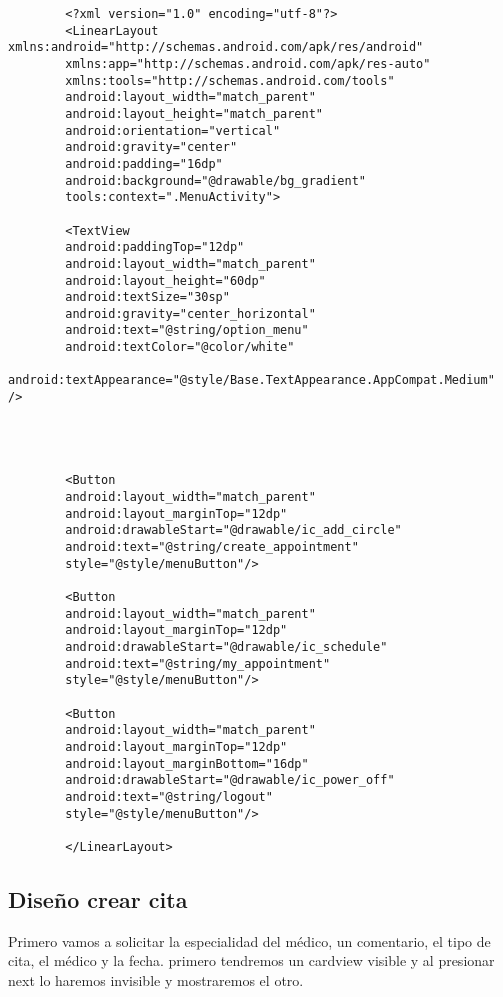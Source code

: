 \documentclass[a4paper]{article}
\begin{document}
	\begin{lstlisting}
		<?xml version="1.0" encoding="utf-8"?>
		<LinearLayout xmlns:android="http://schemas.android.com/apk/res/android"
		xmlns:app="http://schemas.android.com/apk/res-auto"
		xmlns:tools="http://schemas.android.com/tools"
		android:layout_width="match_parent"
		android:layout_height="match_parent"
		android:orientation="vertical"
		android:gravity="center"
		android:padding="16dp"
		android:background="@drawable/bg_gradient"
		tools:context=".MenuActivity">
		
		<TextView
		android:paddingTop="12dp"
		android:layout_width="match_parent"
		android:layout_height="60dp"
		android:textSize="30sp"
		android:gravity="center_horizontal"
		android:text="@string/option_menu"
		android:textColor="@color/white"
		android:textAppearance="@style/Base.TextAppearance.AppCompat.Medium" />
		
		
		
		
		<Button
		android:layout_width="match_parent"
		android:layout_marginTop="12dp"
		android:drawableStart="@drawable/ic_add_circle"
		android:text="@string/create_appointment"
		style="@style/menuButton"/>
		
		<Button
		android:layout_width="match_parent"
		android:layout_marginTop="12dp"
		android:drawableStart="@drawable/ic_schedule"
		android:text="@string/my_appointment"
		style="@style/menuButton"/>
		
		<Button
		android:layout_width="match_parent"
		android:layout_marginTop="12dp"
		android:layout_marginBottom="16dp"
		android:drawableStart="@drawable/ic_power_off"
		android:text="@string/logout"
		style="@style/menuButton"/>
		
		</LinearLayout>
	\end{lstlisting}
		
	
	
	
	\subsection{Diseño crear cita}
	
	Primero vamos a solicitar la especialidad del médico, un comentario, el tipo de cita, el médico y la fecha. primero tendremos un cardview visible y al presionar next lo haremos invisible y mostraremos el otro.
	
\end{document}
